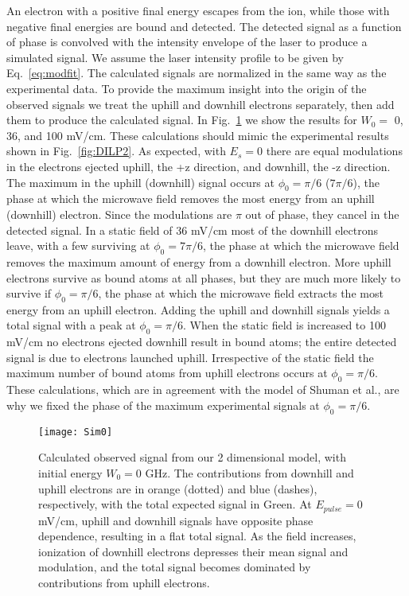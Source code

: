 \documentclass[aps,pra,preprint,groupedaddress]{revtex4-1}
\begin{document}
An electron with a positive final energy escapes from the ion, while those with negative final energies are bound and detected. The detected signal as a function of phase is convolved with the intensity envelope of the laser to produce a simulated signal. We assume the laser intensity profile to be given by Eq.~\ref{eq:modfit}. The calculated signals are normalized in the same way as the experimental data. To provide the maximum insight into the origin of the observed signals we treat the uphill and downhill electrons separately, then add them to produce the calculated signal. 
In Fig.~\ref{fig:2DW0} we show the results for $W_0 =$ 0, 36, and 100 mV/cm. These calculations should mimic the experimental results shown in Fig.~\ref{fig:DILP2}. As expected, with $E_s=0$ there are equal modulations in the electrons ejected uphill, the +z direction, and downhill, the -z direction. The maximum in the uphill (downhill) signal occurs at $\phi_0=\pi/6$ ($7\pi/6$), the phase at which the microwave field removes the most energy from an uphill (downhill) electron. Since the modulations are $\pi$ out of phase, they cancel in the detected signal. In a static field of 36 mV/cm most of the downhill electrons leave, with a few surviving at $\phi_0=7\pi/6$, the phase at which the microwave field removes the maximum amount of energy from a downhill electron. More uphill electrons survive as bound atoms at all phases, but they are much more likely to survive if $\phi_0=\pi/6$, the phase at which the microwave field extracts the most energy from an uphill electron. Adding the uphill and downhill signals yields a total signal with a peak at $\phi_0=\pi/6$. When the static field is increased to 100 mV/cm no electrons ejected downhill result in bound atoms; the entire detected signal is due to electrons launched uphill. Irrespective of the static field the maximum number of bound atoms from uphill electrons occurs at $\phi_0=\pi/6$. These calculations, which are in agreement with the model of Shuman et al., are why we fixed the phase of the maximum experimental signals at $\phi_0=\pi/6$.

\begin{figure}
	\texttt{[image: Sim0]}
	\caption{Calculated observed signal from our 2 dimensional model, with initial energy $W_0 = 0$ GHz. The contributions from downhill and uphill electrons are in orange (dotted) and blue (dashes), respectively, with the total expected signal in Green. At $E_{pulse} = 0$ mV/cm, uphill and downhill signals have opposite phase dependence, resulting in a flat total signal. As the field increases, ionization of downhill electrons depresses their mean signal and modulation, and the total signal becomes dominated by contributions from uphill electrons.}
	\label{fig:2DW0}
\end{figure}
\end{document}
